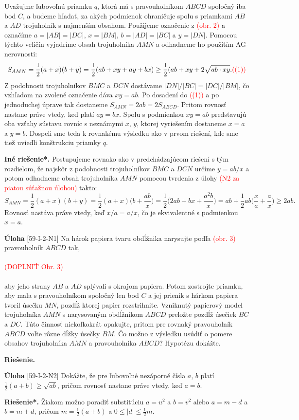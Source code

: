 \documentclass{article}
\newcommand{\rie}{\textbf{Riešenie.} }
\newcommand{\rieh}{\textbf{Riešenie*.} }
\newcommand\todo[1]{\noindent\textcolor{red}{(#1)}}
\newcommand{\problem}[4]{
  \begin{tcolorbox}[breakable,notitle,boxrule=0pt,colback=light-gray,colframe=light-gray]
    \textbf{Úloha}
    [#1] #3
  \end{tcolorbox}
  \noindent#4
}
\begin{document}
{Uvažujme ľubovoľnú priamku $q$, ktorá má s pravouholníkom $ABCD$ spoločný iba
bod $C$, a budeme hľadať, za akých podmienok ohraničuje spolu s priamkami $AB$ a $AD$
trojuholník s najmenším obsahom. Použijeme označenie z \todo{obr. 2} a označíme $a = |AB|
= |DC|$, $x = |BM|$, $b = |AD| = |BC|$ a $y = |DN|$. Pomocou týchto veličín vyjadríme
obsah trojuholníka $AMN$ a odhadneme ho použitím AG-nerovnosti:
$$S_{AMN}=\frac{1}{2}(a + x)(b + y) = \frac{1}{2}(ab + xy + ay + bx)\geq \frac{1}{2}(ab + xy + 2\sqrt{ab \cdot xy}. \todo{(1)}$$
Z podobnosti trojuholníkov $BMC$ a $DCN$ dostávame $|DN|/|BC| = |DC|/|BM|$, čo
vzhľadom na zvolené označenie dáva $xy = ab$. Po dosadení do \todo{(1)} a po jednoduchej
úprave tak dostaneme $S_{AMN} = 2ab = 2S_{ABCD}$. Pritom rovnosť nastane práve vtedy, keď platí $ay = bx$. Spolu s podmienkou $xy = ab$ predstavujú oba vzťahy sústavu rovníc s neznámymi $x$, $y$, ktorej vyriešením dostaneme $x = a$ a $y = b$. Dospeli sme teda
k rovnakému výsledku ako v prvom riešení, kde sme tiež uviedli konštrukciu priamky $q$.

\textbf{Iné riešenie*.} Postupujeme rovnako ako v predchádzajúcom riešení s tým rozdielom, že najskôr z podobnosti trojuholníkov $BMC$ a $DCN$ určíme $y = ab/x$ a potom odhadneme obsah trojuholníka $AMN$ pomocou tvrdenia z úlohy \todo{N2 za piatou súťažnou
úlohou} takto:
$$S_{AMN} =\frac{1}{2}(a + x)(b + y) =\frac{1}{2}(a + x)\bigg(b +\frac{ab}{x}\bigg)=\frac{1}{2}\bigg(2ab + bx + \frac{a^2 b}{x}\bigg)= ab +\frac{1}{2}ab\bigg(\frac{x}{a}+\frac{a}{x}\bigg)\geq 2ab.$$
Rovnosť nastáva práve vtedy, keď $x/a = a/x$, čo je ekvivalentné s podmienkou $x = a$.
}


\problem{59-I-2-N1}{}{
Na hárok papiera tvaru obdĺžnika narysujte podľa \todo{obr. 3} pravouholník $ABCD$ tak,\\
\\
\todo{DOPLNIŤ Obr. 3}\\
\\
aby jeho strany $AB$ a $AD$ splývali s okrajom papiera. Potom zostrojte priamku, aby mala s pravouholníkom spoločný len bod $C$ a jej prienik s hárkom papiera tvoril úsečku $MN$, pozdĺž ktorej papier rozstrihnite. Vzniknutý papierový model trojuholníka $AMN$ s narysovaným obdĺžnikom $ABCD$ preložte pozdĺž úsečiek $BC$ a $DC$. Túto činnosť niekoľkokrát opakujte, pritom pre rovnaký pravouholník $ABCD$ voľte rôzne dĺžky úsečky $BM$. Čo možno z výsledku usúdiť o pomere obsahov trojuholníka $AMN$ a pravouholníka $ABCD$? Hypotézu dokážte.
}{
\rie
}

\problem{59-I-2-N2}{}{
Dokážte, že pre ľubovoľné nezáporné čísla $a$, $b$ platí $\frac{1}{2}(a + b) \geq \sqrt{ab}$, pričom rovnosť nastane práve vtedy, keď $a = b$.
}{
\rieh Žiakom možno poradiť substitúciu $a = u^2$ a $b = v^2$ alebo $a = m-d$ a $b = m + d$, pričom $m = \frac{1}{2}(a + b)$ a $0 \leq |d|\leq \frac{1}{2} m$.
}
\end{document}
